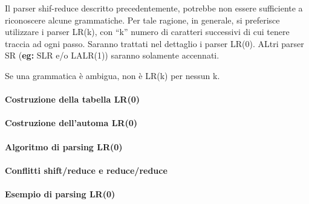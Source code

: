 \documentclass{subfiles}
\begin{document}
Il parser shif-reduce descritto precedentemente, potrebbe non essere sufficiente a riconoscere alcune grammatiche.
Per tale ragione, in generale, si preferisce utilizzare i parser LR(k), con ``k'' numero di caratteri successivi di cui tenere traccia ad ogni passo.
Saranno trattati nel dettaglio i parser LR(0). ALtri parser SR (\textbf{eg:} SLR e/o LALR(1)) saranno solamente accennati.

\begin{Remark*}
    Se una grammatica è ambigua, non è LR(k) per nessun k.
\end{Remark*}

\paragraph{Costruzione della tabella LR(0)}


\paragraph{Costruzione dell'automa LR(0)}


\paragraph{Algoritmo di parsing LR(0)}


\paragraph{Conflitti shift/reduce e reduce/reduce}


\paragraph{Esempio di parsing LR(0)}

\clearpage
\end{document}
